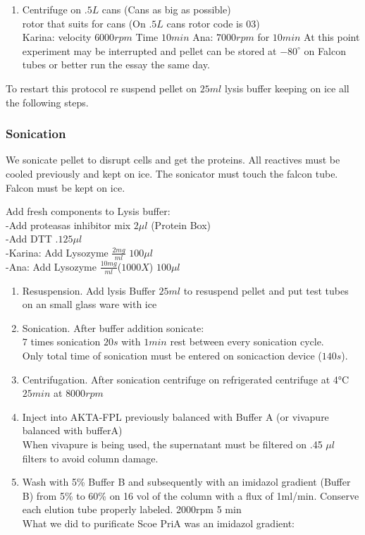 \documentclass[]{article}
\providecommand{\tightlist}{%
  \setlength{\itemsep}{0pt}\setlength{\parskip}{0pt}}
\begin{document}
\begin{enumerate}
\def\labelenumi{\arabic{enumi}.}
\tightlist
\item
  Centrifuge on \(.5L\) cans (Cans as big as possible)\\
  rotor that suits for cans (On \(.5L\) cans rotor code is 03)\\
  Karina: velocity \(6000 rpm\) Time \(10 min\) Ana: \(7000rpm\) for
  \(10 min\) At this point experiment may be interrupted and pellet can
  be stored at \(-80^{\circ}\) on Falcon tubes or better run the essay
  the same day.
\end{enumerate}

To restart this protocol re suspend pellet on \(25 ml\) lysis buffer
keeping on ice all the following steps.

\subsubsection{Sonication}\label{sonication}

We sonicate pellet to disrupt cells and get the proteins. All reactives
must be cooled previously and kept on ice. The sonicator must touch the
falcon tube. Falcon must be kept on ice.

Add fresh components to Lysis buffer:\\
-Add proteasas inhibitor mix \(2\mu l\) (Protein Box)\\
-Add DTT \(.1 25\mu l\)\\
-Karina: Add Lysozyme \(\frac{2mg}{ml}\) \(100\mu l\)\\
-Ana: Add Lysozyme \(\frac{10mg}{ml}\)(\(1000X\)) \(100\mu l\)

\begin{enumerate}
\def\labelenumi{\arabic{enumi}.}
\setcounter{enumi}{1}
\item
  Resuspension. Add lysis Buffer \(25ml\) to resuspend pellet and put
  test tubes on an small glass ware with ice
\item
  Sonication. After buffer addition sonicate:\\
  \(7\) times sonication \(20s\) with \(1min\) rest between every
  sonication cycle.\\
  Only total time of sonication must be entered on sonicaction device
  (\(140s\)).
\item
  Centrifugation. After sonication centrifuge on refrigerated centrifuge
  at 4°C \(25 min\) at \(8000 rpm\)
\item
  Inject into AKTA-FPL previously balanced with Buffer A (or vivapure
  balanced with bufferA)\\
  When vivapure is being used, the supernatant must be filtered on .45
  \(\mu l\) filters to avoid column damage.
\item
  Wash with 5\% Buffer B and subsequently with an imidazol gradient
  (Buffer B) from 5\% to 60\% on 16 vol of the column with a flux of
  1ml/min. Conserve each elution tube properly labeled. 2000rpm 5 min\\
  What we did to purificate Scoe PriA was an imidazol gradient:
\end{enumerate}
\end{document}
